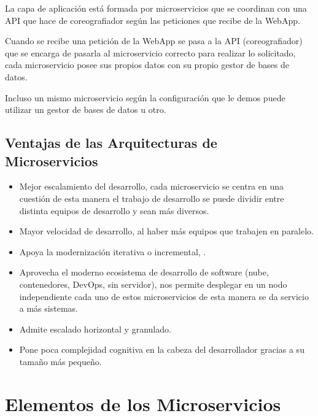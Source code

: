\documentclass[12pt]{report} %
\begin{document}
La capa de aplicación está formada por microservicios que se coordinan con una API que hace de coreografiador según las peticiones que recibe de la WebApp.

Cuando se recibe una petición de la WebApp se pasa a la API (coreografiador) que se encarga de pasarla al microservicio correcto para realizar lo solicitado, cada microservicio posee sus propios datos con su propio gestor de bases de datos. 

Incluso un mismo microservicio según la configuración que le demos puede utilizar un gestor de bases de datos u otro.

\subsection{Ventajas de las Arquitecturas de Microservicios}
\begin{itemize}
	\item	Mejor escalamiento del desarrollo, cada microservicio se centra en una cuestión de esta manera el trabajo de desarrollo se puede dividir entre distinta equipos de desarrollo y sean más diversos.
	\item	Mayor velocidad de desarrollo, al haber más equipos que trabajen en paralelo.
	\item	Apoya la modernización iterativa o incremental, .
	\item	Aprovecha el moderno ecosistema de desarrollo de software (nube, contenedores, DevOps, sin servidor), nos permite desplegar en un nodo independiente cada uno de estos microservicios de esta manera se da servicio a más sistemas.
	\item	Admite escalado horizontal y granulado.
	\item	Pone poca complejidad cognitiva en la cabeza del desarrollador gracias a su tamaño más pequeño.
\end{itemize}

\section{Elementos de los Microservicios}
\end{document}
